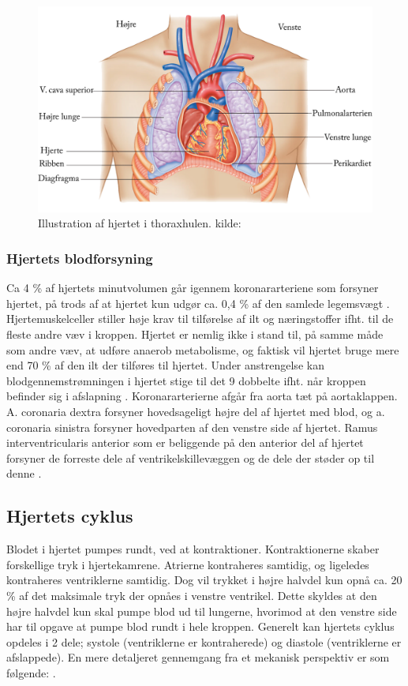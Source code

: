 \begin{figure}[H] %
\begin{center}
\includegraphics[width=1\linewidth]{figures/thorax}
\end{center}
\caption{Illustration af hjertet i thoraxhulen. kilde: \cite{cindy}}
\label{fig:hjerte_placering}
\end{figure}

\subsubsection{Hjertets blodforsyning}
Ca 4 \% af hjertets minutvolumen går igennem koronararteriene som forsyner hjertet, på trods af at hjertet kun udgør ca. 0,4 \% af den samlede legemsvægt \cite{gronanatomi}. Hjertemuskelceller stiller høje krav til tilførelse af ilt og næringstoffer ifht. til de fleste andre væv i kroppen. Hjertet er nemlig ikke i stand til, på samme måde som andre væv, at udføre anaerob metabolisme, og faktisk vil hjertet bruge mere end 70 \% af den ilt der tilføres til hjertet. Under anstrengelse kan blodgennemstrømningen i hjertet stige til det 9 dobbelte ifht. når kroppen befinder sig i afslapning \cite{martini}. Koronararterierne afgår fra aorta tæt på aortaklappen. A. coronaria dextra forsyner hovedsageligt højre del af hjertet med blod, og a. coronaria sinistra forsyner hovedparten af den venstre side af hjertet. Ramus interventricularis anterior som er beliggende på den anterior del af hjertet forsyner de forreste dele af ventrikelskillevæggen og de dele der støder op til denne \cite{gronanatomi}.


\subsection{Hjertets cyklus}
Blodet i hjertet pumpes rundt, ved at kontraktioner. Kontraktionerne skaber forskellige tryk i hjertekamrene. Atrierne kontraheres samtidig, og ligeledes kontraheres ventriklerne samtidig. Dog vil trykket i højre halvdel kun opnå ca. 20 \% af det maksimale tryk der opnåes i venstre ventrikel. Dette skyldes at den højre halvdel kun skal pumpe blod ud til lungerne, hvorimod at den venstre side har til opgave at pumpe blod rundt i hele kroppen. Generelt kan hjertets cyklus opdeles i 2 dele; systole (ventriklerne er kontraherede)  og diastole (ventriklerne er afslappede). En mere detaljeret gennemgang fra et mekanisk perspektiv er som følgende: \cite{gronanatomi}.


